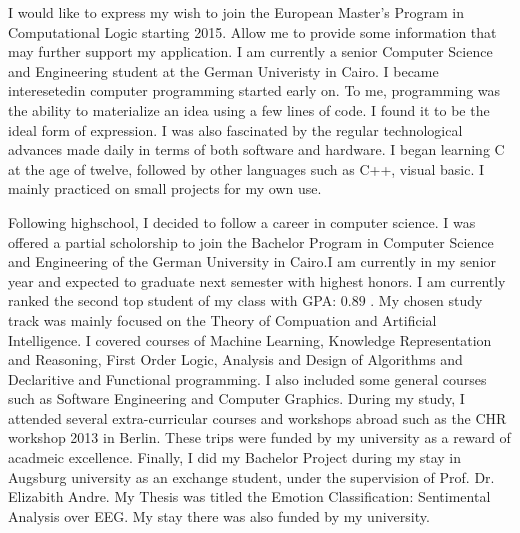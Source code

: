 \documentclass[10pt,stdletter,dateno,sigleft]{newlfm} %
\begin{document}
 
\begin{newlfm}


  I would like to express my wish to join the European Master's Program in
  Computational Logic starting 2015.
  Allow me to provide some information that may further support my application.
  I am currently a senior Computer Science and Engineering student at the German
  Univeristy in Cairo.  I became interesetedin computer programming started
  early on. To me, programming was the ability to  materialize an idea
  using a few lines of code. I found it to be the ideal form of expression. I
  was also fascinated by the regular technological advances made daily in terms
  of both software and hardware. I began learning C at the age of twelve,
  followed by other languages such as C++, visual basic. I mainly practiced on
  small projects for my own use.  

  Following highschool, I decided to follow a career in computer science. I was
  offered a partial scholorship to join the Bachelor Program in Computer Science
  and Engineering of the German University in Cairo.I am currently in my senior
  year and expected to graduate next semester with highest honors. I am
  currently ranked the second top student of my class with GPA: $0.89$ . My
  chosen study track was mainly focused on the Theory of Compuation and
  Artificial Intelligence. I covered courses of Machine Learning, Knowledge
  Representation and Reasoning, First Order Logic, Analysis and Design of
  Algorithms and Declaritive and Functional
  programming. I also included some general courses such as Software Engineering
  and Computer Graphics. During my study, I attended several extra-curricular courses and
  workshops abroad such as the CHR workshop 2013 in Berlin. These trips were
  funded by my university as a reward of acadmeic excellence. Finally, I did my
  Bachelor Project during my stay in Augsburg university as an exchange student,
  under the supervision of Prof. Dr. Elizabith Andre. My Thesis was titled the
  Emotion Classification: Sentimental Analysis over EEG. My stay there was also
  funded by my university.


\end{newlfm}
\end{document}
